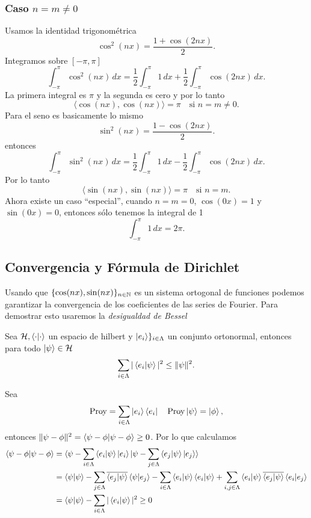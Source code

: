 \documentclass[main.tex]{subfiles}
\begin{document}
\subsubsection{Caso \(n = m \neq 0\)}
Usamos la identidad trigonométrica
\[
\cos^2(nx) = \frac{1 + \cos(2nx)}{2}.
\]
Integramos sobre \([-\pi, \pi]\)
\[
\int_{-\pi}^{\pi} \cos^2(nx) \, dx = \frac{1}{2} \int_{-\pi}^{\pi} 1 \, dx + \frac{1}{2} \int_{-\pi}^{\pi} \cos(2nx) \, dx.
\]
La primera integral es \(\pi\) y la segunda es cero y por lo tanto
\[
\langle \cos(nx), \cos(nx) \rangle = \pi \quad \text{si } n = m \neq 0.
\]
Para el seno es basicamente lo mismo
\[
\sin^2(nx) = \frac{1 - \cos(2nx)}{2}.
\]
entonces
\[
\int_{-\pi}^{\pi} \sin^2(nx) \, dx = \frac{1}{2} \int_{-\pi}^{\pi} 1 \, dx - \frac{1}{2} \int_{-\pi}^{\pi} \cos(2nx) \, dx.
\]
Por lo tanto
\[
\langle \sin(nx), \sin(nx) \rangle = \pi \quad \text{si } n = m.
\]
Ahora existe un caso ``especial'', cuando \(n = m = 0\), \(\cos(0x) = 1\) y \(\sin(0x)=0\), entonces sólo tenemos la integral de 1
\[
\int_{-\pi}^{\pi} 1 \, dx = 2\pi.
\]

\subsection{Convergencia y Fórmula de Dirichlet}
\noindent Usando que \(\{\cos(nx),\sin(nx)\}_{n\in \mathbb N }\) es un sistema ortogonal de funciones podemos garantizar la convergencia de los coeficientes de las series de Fourier. Para demostrar esto usaremos la \emph{desigualdad de Bessel}
\begin{teorema}
  Sea \(\mathcal{H},\braket{\cdot|\cdot}\) un espacio de hilbert y \(\ket{e_i}\}_{i\in\Lambda}\) un conjunto ortonormal, entonces para todo \(\ket{\psi}\in\mathcal{H}\)
  \[
  \sum_{i\in\Lambda}|\braket{e_i|\psi}|^2\leq \|\psi\|^2.
  \]
\end{teorema}
\dem Sea
\[
        \textrm{Proy}=\sum_{i\in\Lambda} \ket{e_i}\bra{e_i}\quad\textrm{Proy}\ket{\psi}=\ket{\phi},
\]
entonces \(\|\psi-\phi\|^2=\braket{\psi-\phi|\psi-\phi}\geq0\). Por lo que calculamos
\begin{align*}
  \braket{\psi-\phi|\psi-\phi}&=\braket{\psi-\sum_{i\in\Lambda}\braket{e_i|\psi}\ket{e_i}|\psi-\sum_{j\in\Lambda}\braket{e_j|\psi}\ket{e_j}}\\
  &=\braket{\psi|\psi}-\sum_{j\in\Lambda}\overline{\braket{e_j|\psi}}\braket{\psi|e_j}-\sum_{i\in\Lambda}\braket{e_i|\psi}\braket{e_i|\psi}+\sum_{i,j\in\Lambda}\braket{e_i|\psi}\overline{\braket{e_j|\psi}}\braket{e_i|e_j}\\
  &=\braket{\psi|\psi}-\sum_{i\in\Lambda}|\braket{e_i|\psi}|^2\geq0
  \end{align*}
\end{document}
